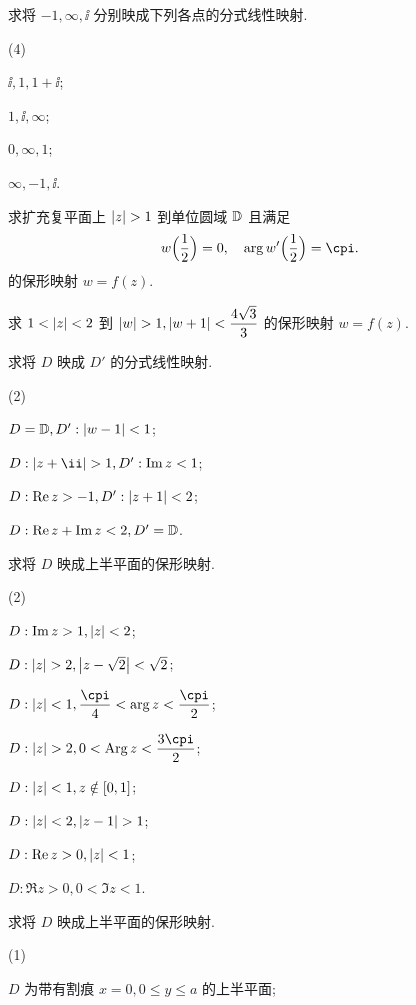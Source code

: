 \begin{homework}
\begin{homework}
    \item 求将 $-1,\infty,\ii$ 分别映成下列各点的分式线性映射.
    \begin{subhomework}(4)
      \item $\ii,1,1+\ii$;
      \item $1,\ii,\infty$;
      \item $0,\infty,1$;
      \item $\infty,-1,\ii$.
    \end{subhomework}
    \item 求扩充复平面上 $\abs{z}>1$ 到单位圆域 ${\mathbb{D}}$ 且满足
    \[
      w\Bigl(\frac12\Bigr)=0,\quad
      \arg w'\Bigl(\frac12\Bigr)=\cpi.
    \]
    的保形映射 $w=f(z)$.
    \item 求 $1<\left|z\right|<2$ 到 $\abs{w}>1, \abs{w+1}<\dfrac{4\sqrt3}3$ 的保形映射 $w=f(z)$.
    \item 求将 $D$ 映成 $D'$ 的分式线性映射.
    \begin{subhomework}(2)
      \item $D={\mathbb{D}}, D': \left|w-1\right|<1$;
      \item $D: \abs{z+\ii}>1, D': \Im z<1$;
      \item $D: \operatorname{Re} z>-1, D': \left|z+1\right|<2$;
      \item $D: \operatorname{Re} z+\operatorname{Im} z<2, D'={\mathbb{D}}$.
    \end{subhomework}
    \item 求将 $D$ 映成上半平面的保形映射.
    \begin{subhomework}(2)
      \item $D: \operatorname{Im} z>1, \left|z\right|<2$;
      \item $D: \abs{z}>2, \abs{z-\sqrt2}<\sqrt 2$;
      \item $D: \abs{z}<1, \dfrac\cpi4<\arg z<\dfrac \cpi2$;
      \smallskip
      \item $D:\abs{z}>2, 0<\Arg z<\dfrac{3\cpi}2$;
      \item $D: \left|z\right|<1, z\notin[0,1]$;
      \item $D: \abs{z}<2, \abs{z-1}>1$;
      \item $D: \operatorname{Re} z>0, \left|z\right|<1$;
      \item $D: \Re z>0, 0<\Im z<1$.
    \end{subhomework}
    \item 求将 $D$ 映成上半平面的保形映射.
    \begin{subhomework}(1)
      \item $D$ 为带有割痕 $x=0,0\le y\le a$ 的上半平面;

\end{subhomework}
\end{homework}
\end{homework}
